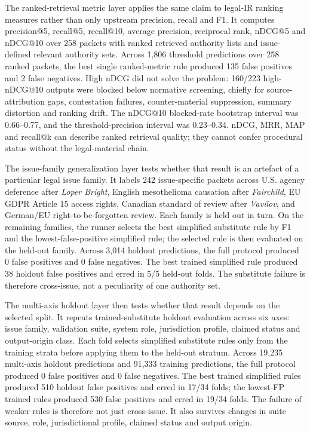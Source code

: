 \documentclass[12pt,a4paper]{article}
\begin{document}
The ranked-retrieval metric layer applies the same claim to legal-IR ranking measures rather than only upstream precision, recall and F1. It computes precision@5, recall@5, recall@10, average precision, reciprocal rank, nDCG@5 and nDCG@10 over 258 packets with ranked retrieved authority lists and issue-defined relevant authority sets. Across 1,806 threshold predictions over 258 ranked packets, the best single ranked-metric rule produced 135 false positives and 2 false negatives. High nDCG did not solve the problem: 160/223 high-nDCG@10 outputs were blocked below normative screening, chiefly for source-attribution gaps, contestation failures, counter-material suppression, summary distortion and ranking drift. The nDCG@10 blocked-rate bootstrap interval was 0.66--0.77, and the threshold-precision interval was 0.23--0.34. nDCG, MRR, MAP and recall@k can describe ranked retrieval quality; they cannot confer procedural status without the legal-material chain.

The issue-family generalization layer tests whether that result is an artefact of a particular legal issue family. It labels 242 issue-specific packets across U.S. agency deference after \textit{Loper Bright}, English mesothelioma causation after \textit{Fairchild}, EU GDPR Article 15 access rights, Canadian standard of review after \textit{Vavilov}, and German/EU right-to-be-forgotten review. Each family is held out in turn. On the remaining families, the runner selects the best simplified substitute rule by F1 and the lowest-false-positive simplified rule; the selected rule is then evaluated on the held-out family. Across 3,014 holdout predictions, the full protocol produced 0 false positives and 0 false negatives. The best trained simplified rule produced 38 holdout false positives and erred in 5/5 held-out folds. The substitute failure is therefore cross-issue, not a peculiarity of one authority set.

The multi-axis holdout layer then tests whether that result depends on the selected split. It repeats trained-substitute holdout evaluation across six axes: issue family, validation suite, system role, jurisdiction profile, claimed status and output-origin class. Each fold selects simplified substitute rules only from the training strata before applying them to the held-out stratum. Across 19,235 multi-axis holdout predictions and 91,333 training predictions, the full protocol produced 0 false positives and 0 false negatives. The best trained simplified rules produced 510 holdout false positives and erred in 17/34 folds; the lowest-FP trained rules produced 530 false positives and erred in 19/34 folds. The failure of weaker rules is therefore not just cross-issue. It also survives changes in suite source, role, jurisdictional profile, claimed status and output origin.
\end{document}

